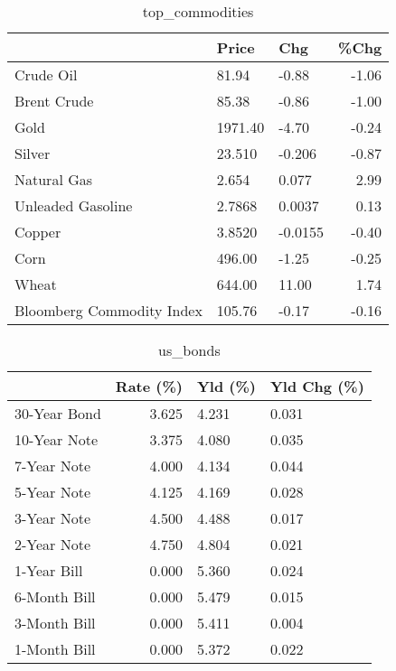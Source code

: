 \documentclass{article}%
\begin{document}
\begin{table}[htbp]%
\caption{top\_commodities}%
\centering%
\begin{adjustbox}{width=1\textwidth}%
\begin{tabular}{lllr}
\toprule
                          &   Price &     Chg &  \%Chg \\
\midrule
               Crude Oil  &   81.94 &   -0.88 & -1.06 \\
             Brent Crude  &   85.38 &   -0.86 & -1.00 \\
                    Gold  & 1971.40 &   -4.70 & -0.24 \\
                  Silver  &  23.510 &  -0.206 & -0.87 \\
             Natural Gas  &   2.654 &   0.077 &  2.99 \\
       Unleaded Gasoline  &  2.7868 &  0.0037 &  0.13 \\
                  Copper  &  3.8520 & -0.0155 & -0.40 \\
                    Corn  &  496.00 &   -1.25 & -0.25 \\
                   Wheat  &  644.00 &   11.00 &  1.74 \\
Bloomberg Commodity Index &  105.76 &   -0.17 & -0.16 \\
\bottomrule
\end{tabular}
%
\end{adjustbox}%
\end{table}

%


\begin{table}[htbp]%
\caption{us\_bonds}%
\centering%
\begin{adjustbox}{width=1\textwidth}%
\begin{tabular}{lrll}
\toprule
             &  Rate (\%) & Yld (\%) & Yld Chg (\%) \\
\midrule
30-Year Bond &     3.625 &   4.231 &       0.031 \\
10-Year Note &     3.375 &   4.080 &       0.035 \\
 7-Year Note &     4.000 &   4.134 &       0.044 \\
 5-Year Note &     4.125 &   4.169 &       0.028 \\
 3-Year Note &     4.500 &   4.488 &       0.017 \\
 2-Year Note &     4.750 &   4.804 &       0.021 \\
 1-Year Bill &     0.000 &   5.360 &       0.024 \\
6-Month Bill &     0.000 &   5.479 &       0.015 \\
3-Month Bill &     0.000 &   5.411 &       0.004 \\
1-Month Bill &     0.000 &   5.372 &       0.022 \\
\bottomrule
\end{tabular}
%
\end{adjustbox}%
\end{table}
\end{document}
